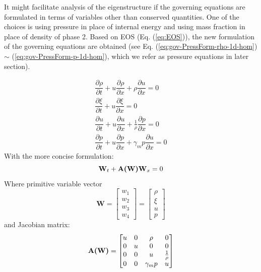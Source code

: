 It might facilitate analysis of the eigenstructure if the governing equations are formulated in terms of variables other than conserved quantities. One of the choices is using pressure in place of internal energy and using mass fraction in place of density of phase 2. Based on EOS (Eq. (\ref{eq:EOS})), the new formulation of the governing equations are obtained (see Eq. (\ref{eq:gov-PressForm-rho-1d-hom}) $\sim$ (\ref{eq:gov-PressForm-p-1d-hom}), which we refer as pressure equations in later section).

\begin{eqnarray}
\dfrac{\partial \rho}{\partial t} + u \dfrac{\partial \rho} {\partial x} + \rho \dfrac{\partial u} {\partial x}= 0 \label{eq:gov-PressForm-rho-1d-hom} \\
\dfrac{\partial \xi}{\partial t} + u \dfrac{\partial \xi} {\partial x}= 0 \label{eq:gov-PressForm-ks-1d-hom}\\
\dfrac{\partial u}{\partial t} + u \dfrac{\partial u} {\partial x} + \frac{1}{\rho} \dfrac{\partial p} {\partial x}= 0 \label{eq:gov-PressForm-v-1d-hom} \\
\dfrac{\partial p}{\partial t} + u \dfrac{\partial p} {\partial x} + \gamma_m p \dfrac{\partial u} {\partial x} = 0 \label{eq:gov-PressForm-p-1d-hom}
\end{eqnarray}
With the more concise formulation: 
\begin{equation}
\textbf{W}_t + \textbf{A(\textbf{W})} \textbf{W}_x = 0
\end{equation}
Where primitive variable vector
\begin{equation}
   \textbf{W}=\begin{bmatrix}
         w_1 \\
         w_2 \\
         w_3 \\
         w_4
     \end{bmatrix}
    =\begin{bmatrix}
         \rho \\
         \xi \\
         u   \\
         p
     \end{bmatrix}
\end{equation}
and Jacobian matrix: 
\begin{equation}
   \textbf{A(\textbf{W})}=\begin{bmatrix}
         u & 0 & \rho       & 0 \\
         0 & u & 0          & 0 \\
         0 & 0 & u          &\frac{1}{\rho} \\
         0 & 0 & \gamma_m p & u
     \end{bmatrix}
\end{equation}
